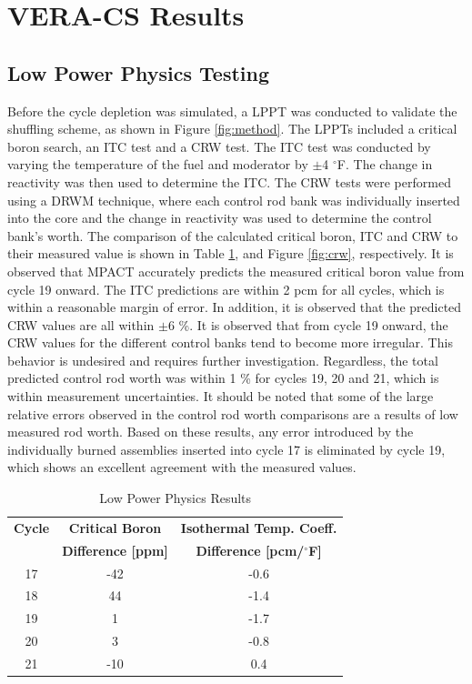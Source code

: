 \documentclass[edeposit,fullpage,11pt]{uiucthesis2009}
\begin{document}
\section{VERA-CS Results}

\subsection{Low Power Physics Testing}
Before the cycle depletion was simulated, a \gls{LPPT} was conducted to validate the shuffling scheme, as shown in Figure \ref{fig:method}.
The \gls{LPPT}s included a critical boron search, an \gls{ITC} test and a \gls{CRW} test. 
The \gls{ITC} test was conducted by varying the temperature of the fuel and moderator by $\pm$4 $^\circ$F. 
The change in reactivity was then used to determine the \gls{ITC}. 
The \gls{CRW} tests were performed using a \gls{DRWM} technique, where each control rod bank was individually inserted into the core and the change in reactivity was used to determine the control bank's worth. 
The comparison of the calculated critical boron, \gls{ITC} and \gls{CRW} to their measured value is shown in Table \ref{tab:cb}, and Figure \ref{fig:crw}, respectively. 
It is observed that MPACT accurately predicts the measured critical boron value from cycle 19 onward.
The \gls{ITC} predictions are within 2 pcm for all cycles, which is within a reasonable margin of error.
In addition, it is observed that the predicted \gls{CRW} values are all within $\pm6$ \%.
It is observed that from cycle 19 onward, the \gls{CRW} values for the different control banks tend to become more irregular.
This behavior is undesired and requires further investigation.
Regardless, the total predicted control rod worth was within 1 \% for cycles 19, 20 and 21, which is within measurement uncertainties. 
It should be noted that some of the large relative errors observed in the control rod worth comparisons are a results of low measured rod worth. 
Based on these results, any error introduced by the individually burned assemblies inserted into cycle 17 is eliminated by cycle 19, which shows an excellent agreement with the measured values. 

\begin{table}
\caption{Low Power Physics Results}
\label{tab:cb}
\begin{center}
\begin{tabular}[!t]{ccc}\hline
\textbf{Cycle}      & \textbf{Critical Boron}   & \textbf{Isothermal Temp. Coeff.}      \\
           & \textbf{Difference [ppm]} & \textbf{Difference [pcm/$^{\circ}$F]}  \\ \hline
17 & -42 & -0.6     \\
18 & 44  & -1.4     \\
19 & 1   & -1.7     \\
20 & 3   & -0.8    \\
21 & -10 &  0.4     \\\hline
\end{tabular}
\end{center}
\end{table}
\end{document}
